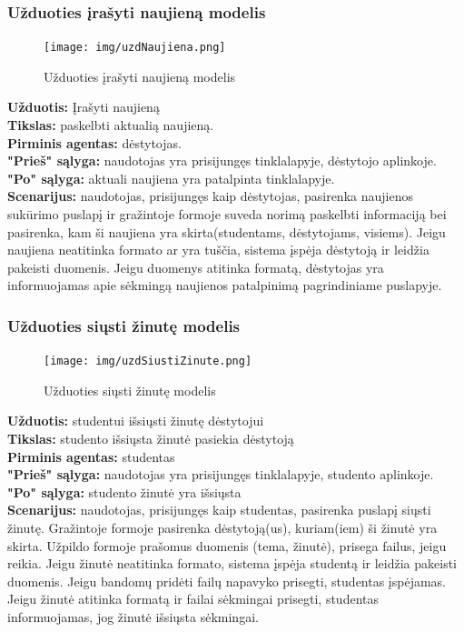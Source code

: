\documentclass{VUMIFPSkursinis}
\begin{document}
\subsubsection{Užduoties įrašyti naujieną modelis}
\begin{figure}[H]
\centering
\texttt{[image: img/uzdNaujiena.png]}
\caption{Užduoties įrašyti naujieną modelis}
\label{fig:rnaujiena}
\end{figure}
\textbf{Užduotis: } Įrašyti naujieną\\
\textbf{Tikslas: } paskelbti aktualią naujieną.\\
\textbf{Pirminis agentas: } dėstytojas.\\
\textbf{"Prieš" sąlyga: } naudotojas yra prisijungęs tinklalapyje, dėstytojo aplinkoje.\\
\textbf{"Po" sąlyga: } aktuali naujiena yra patalpinta tinklalapyje.\\
\textbf{Scenarijus: } naudotojas, prisijungęs kaip dėstytojas, pasirenka naujienos sukūrimo puslapį ir gražintoje formoje suveda norimą paskelbti informaciją bei pasirenka, kam ši naujiena yra skirta(studentams, dėstytojams, visiems). Jeigu naujiena neatitinka formato ar yra tuščia, sistema įspėja dėstytoją ir leidžia pakeisti duomenis. Jeigu duomenys atitinka formatą, dėstytojas yra informuojamas apie sėkmingą naujienos patalpinimą pagrindiniame puslapyje.
\subsubsection{Užduoties siųsti žinutę modelis}
\begin{figure}[H]
\centering
\texttt{[image: img/uzdSiustiZinute.png]}
\caption{Užduoties siųsti žinutę modelis}
\label{fig:zinute}
\end{figure}
\textbf{Užduotis: } studentui išsiųsti žinutę dėstytojui\\
\textbf{Tikslas: } studento išsiųsta žinutė pasiekia dėstytoją\\
\textbf{Pirminis agentas: } studentas\\
\textbf{"Prieš" sąlyga: } naudotojas yra prisijungęs tinklalapyje, studento aplinkoje.\\
\textbf{"Po" sąlyga: } studento žinutė yra išsiųsta\\
\textbf{Scenarijus: } naudotojas, prisijungęs kaip studentas, pasirenka puslapį siųsti žinutę. Gražintoje formoje pasirenka dėstytoją(us), kuriam(iem) ši žinutė yra skirta. Užpildo formoje prašomus duomenis (tema, žinutė), prisega failus, jeigu reikia. Jeigu žinutė neatitinka formato, sistema įspėja studentą ir leidžia pakeisti duomenis. Jeigu bandomų pridėti failų napavyko prisegti, studentas įspėjamas. Jeigu žinutė atitinka formatą ir failai sėkmingai prisegti, studentas informuojamas, jog žinutė išsiųsta sėkmingai.
\end{document}
